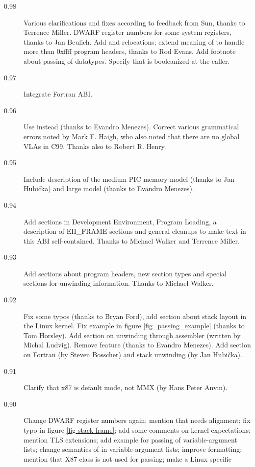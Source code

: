 \documentclass[12pt]{report}
\begin{document}
\begin{description}


\item[0.98] Various clarifications and fixes according to feedback
  from Sun, thanks to Terrence Miller.  DWARF register numbers for some
  system registers, thanks to Jan Beulich.  Add  and
   relocations; extend meaning of 
  to handle more than 0xffff program headers, thanks to Rod Evans.
  Add footnote about passing of  datatypes. 
  Specify that  is booleanized at the caller.
\item[0.97] Integrate Fortran ABI.
\item[0.96] Use  instead 
  (thanks to Evandro Menezes).  Correct various grammatical errors
  noted by Mark F. Haigh, who also noted that there are no global VLAs
  in C99.  Thanks also to Robert R. Henry.
\item[0.95] Include description of the medium PIC memory model (thanks
  to Jan Hubi\v{c}ka) and large model (thanks to Evandro Menezes).
\item[0.94] Add sections in Development Environment, Program Loading,
  a description of EH_FRAME sections and general cleanups to make
  text in this ABI self-contained.  Thanks to Michael Walker and Terrence
  Miller.
\item[0.93] Add sections about program headers, new section types and
  special sections for unwinding information.  Thanks to Michael
  Walker.
\item[0.92] Fix some typos (thanks to Bryan Ford), add section about
  stack layout in the Linux kernel.  Fix example in figure
  \ref{fig_passing_example} (thanks to Tom Horsley).  Add section on
  unwinding through assembler (written by Michal Ludvig).  Remove
   feature (thanks to Evandro Menezes).  Add section on
  Fortran (by Steven Bosscher) and stack unwinding (by Jan
  Hubi\v{c}ka).
\item[0.91] Clarify that x87 is default mode, not MMX (by Hans Peter
  Anvin).
\item[0.90]
  Change DWARF register
  numbers again; mention that  needs alignment; fix typo
  in figure \ref{fig-stack-frame}; add some comments on kernel
  expectations; mention TLS extensions; add example for passing of
  variable-argument lists; change semantics of \RAX in
  variable-argument lists; improve formatting; mention that X87 class
  is not used for passing; make  a Linux specific

\end{description}
\end{document}
